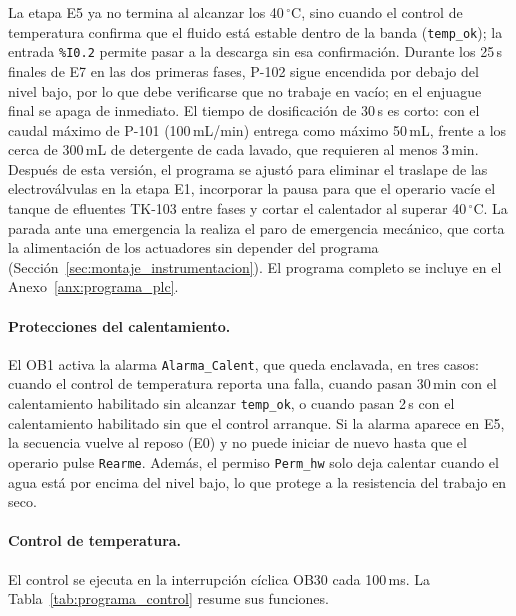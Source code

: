 La etapa E5 ya no termina al alcanzar los 40\,$^{\circ}$C, sino cuando el control de temperatura confirma que el fluido está estable dentro de la banda (\texttt{temp\_ok}); la entrada \texttt{\%I0.2} permite pasar a la descarga sin esa confirmación. Durante los 25\,s finales de E7 en las dos primeras fases, P-102 sigue encendida por debajo del nivel bajo, por lo que debe verificarse que no trabaje en vacío; en el enjuague final se apaga de inmediato. El tiempo de dosificación de 30\,s es corto: con el caudal máximo de P-101 (100\,mL/min) entrega como máximo 50\,mL, frente a los cerca de 300\,mL de detergente de cada lavado, que requieren al menos 3\,min. Después de esta versión, el programa se ajustó para eliminar el traslape de las electroválvulas en la etapa E1, incorporar la pausa para que el operario vacíe el tanque de efluentes TK-103 entre fases y cortar el calentador al superar 40\,$^{\circ}$C. La parada ante una emergencia la realiza el paro de emergencia mecánico, que corta la alimentación de los actuadores sin depender del programa (Sección~\ref{sec:montaje_instrumentacion}). El programa completo se incluye en el Anexo~\ref{anx:programa_plc}.

\paragraph{Protecciones del calentamiento.} El OB1 activa la alarma \texttt{Alarma\_Calent}, que queda enclavada, en tres casos: cuando el control de temperatura reporta una falla, cuando pasan 30\,min con el calentamiento habilitado sin alcanzar \texttt{temp\_ok}, o cuando pasan 2\,s con el calentamiento habilitado sin que el control arranque. Si la alarma aparece en E5, la secuencia vuelve al reposo (E0) y no puede iniciar de nuevo hasta que el operario pulse \texttt{Rearme}. Además, el permiso \texttt{Perm\_hw} solo deja calentar cuando el agua está por encima del nivel bajo, lo que protege a la resistencia del trabajo en seco.

\paragraph{Control de temperatura.} El control se ejecuta en la interrupción cíclica OB30 cada 100\,ms. La Tabla~\ref{tab:programa_control} resume sus funciones.

